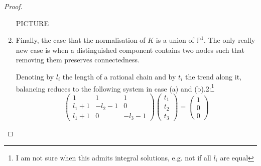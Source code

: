 \documentclass[11pt]{amsart}
\newcommand{\PP}{\mathbb P}
\newcommand{\OO}{\mathcal O}
\theoremstyle{plain}
\theoremstyle{definition}
\begin{document}
\begin{proof}
\begin{enumerate}
 PICTURE
 
 \item Finally, the case that the normalisation of $K$ is a union of $\PP^1$. The only really new case is when a distinguished component contains two nodes such that removing them preserves connectedness. \begin{comment}It can be shown that case (a) admits solution as soon as $K$ is not the union of two $\PP^1$ along three nodes. Case (b) admits a solution if and only if either $q_1$ and $q_2$ belong to different components, or they belong to the same component and $K$ is not the union of two $\PP^1$ along three nodes.\end{comment}
 
Denoting by $l_i$ the length of a rational chain and by $t_i$ the trend along it, balancing reduces to the following system in case (a) and (b).2:\footnote{I am not sure when this admits integral solutions, e.g. not if all $l_i$ are equal}
\[
\begin{pmatrix}
 1 & 1 & 1 \\ l_1+1 & -l_2-1 & 0 \\ l_1+1 & 0 & -l_3-1
\end{pmatrix}
\begin{pmatrix}
 t_1\\ t_2\\ t_3
\end{pmatrix}
=
\begin{pmatrix}
 1 \\ 0 \\ 0
\end{pmatrix}
\]

\end{enumerate}


\end{proof}
\end{document}
